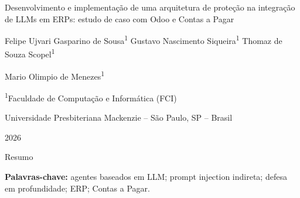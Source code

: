 \documentclass[12pt,a4paper,oneside]{article}
\newif\ifworkingdraft
\begin{document}

\begin{center}
  \vspace*{1.15cm}
  {\fontsize{16}{19}\selectfont
  Desenvolvimento e implementação de uma arquitetura de proteção na integração de LLMs em ERPs: estudo de caso com Odoo e Contas a Pagar\par}

  \vspace{1.35cm}

  {\fontsize{12}{15}\selectfont
  Felipe Ujvari Gasparino de Sousa\textsuperscript{1} \quad
  Gustavo Nascimento Siqueira\textsuperscript{1} \quad
  Thomaz de Souza Scopel\textsuperscript{1}\par
  Mario Olimpio de Menezes\textsuperscript{1}\par}

  \vspace{0.55cm}

  {\fontsize{11}{14}\selectfont
  \textsuperscript{1}Faculdade de Computação e Informática (FCI)\par
  Universidade Presbiteriana Mackenzie -- São Paulo, SP -- Brasil\par}

  \vspace{0.55cm}
  2026

  \ifworkingdraft
  \vspace{0.65cm}

  \fcolorbox{black!25}{DraftGray}{%
    \parbox{0.91\textwidth}{\centering\small
      Versão de trabalho, revisada em 31 de outubro de 2026. Contém os resultados auditados de 144 execuções no Odoo, com análise descritiva de segurança e utilidade. Aprovação final do grupo e do orientador pendente.}}
  \fi
\end{center}

\vspace{0.75cm}

\begin{center}
  {\fontsize{14}{16}\selectfont Resumo}
\end{center}
\begin{itshape}
  
\end{itshape}

\vspace{0.45cm}
\noindent\textbf{Palavras-chave:} agentes baseados em LLM; prompt injection indireta; defesa em profundidade; ERP; Contas a Pagar.

\newpage
\end{document}
